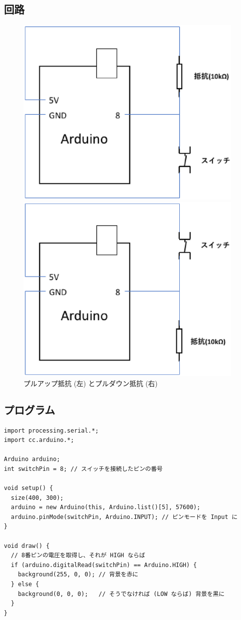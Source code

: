 \documentclass[11pt,a4paper]{jarticle}
\begin{document}
\newpage

\subsection{回路}
\begin{figure}[htbp]
 \begin{minipage}{0.5\columnwidth}
  \centering
  \includegraphics[width=0.62\columnwidth]{img/pull_up.eps}
 \end{minipage}
 \begin{minipage}{0.5\columnwidth}
  \centering
  \includegraphics[width=0.62\columnwidth]{img/pull_down.eps}
 \end{minipage}
  \caption{プルアップ抵抗 (左) とプルダウン抵抗 (右)}
\end{figure}


\subsection{プログラム}
\begin{lstlisting}
import processing.serial.*;
import cc.arduino.*;

Arduino arduino;
int switchPin = 8; // スイッチを接続したピンの番号
 
void setup() {
  size(400, 300);
  arduino = new Arduino(this, Arduino.list()[5], 57600);
  arduino.pinMode(switchPin, Arduino.INPUT); // ピンモードを Input に
}
 
void draw() {
  // 8番ピンの電圧を取得し、それが HIGH ならば
  if (arduino.digitalRead(switchPin) == Arduino.HIGH) {
    background(255, 0, 0); // 背景を赤に
  } else {
    background(0, 0, 0);   // そうでなければ (LOW ならば) 背景を黒に
  }
}
\end{lstlisting}
\end{document}
